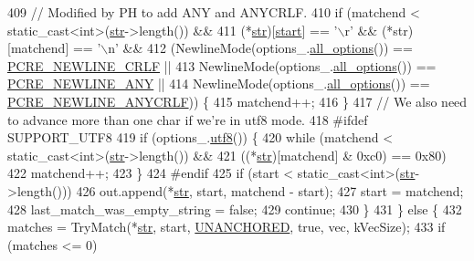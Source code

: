 \begin{DoxyCode}
409         \textcolor{comment}{// Modified by PH to add ANY and ANYCRLF.}
410         \textcolor{keywordflow}{if} (matchend < static\_cast<int>(\hyperlink{group__MOD__DAV_gaab9226fe8f632e1f998e24276d478f30}{str}->length()) &&
411             (*\hyperlink{group__MOD__DAV_gaab9226fe8f632e1f998e24276d478f30}{str})[\hyperlink{group__APACHE__CORE__DAEMON_ga6d3a995932cd00f6b3473898aa90d596}{start}] == \textcolor{charliteral}{'\(\backslash\)r'} && (*str)[matchend] == \textcolor{charliteral}{'\(\backslash\)n'} &&
412             (NewlineMode(options\_.\hyperlink{classpcrecpp_1_1RE__Options_ad0044e20b77cd735b6fb70b6dd8dc245}{all\_options}()) == \hyperlink{pcre_8h_a6d5da3bae2692b4bc458f5638dcafd57}{PCRE\_NEWLINE\_CRLF} ||
413              NewlineMode(options\_.\hyperlink{classpcrecpp_1_1RE__Options_ad0044e20b77cd735b6fb70b6dd8dc245}{all\_options}()) == \hyperlink{pcre_8h_a1c379cd4b51ea037dce7e8c79f9ee57d}{PCRE\_NEWLINE\_ANY} ||
414              NewlineMode(options\_.\hyperlink{classpcrecpp_1_1RE__Options_ad0044e20b77cd735b6fb70b6dd8dc245}{all\_options}()) == 
      \hyperlink{pcre_8h_af25f19586bec4187ca77e617ddc9b98b}{PCRE\_NEWLINE\_ANYCRLF})) \{
415           matchend++;
416         \}
417         \textcolor{comment}{// We also need to advance more than one char if we're in utf8 mode.}
418 \textcolor{preprocessor}{#ifdef SUPPORT\_UTF8}
419         \textcolor{keywordflow}{if} (options\_.\hyperlink{classpcrecpp_1_1RE__Options_a5510afddee3c4e0ddc1d12dfdd210512}{utf8}()) \{
420           \textcolor{keywordflow}{while} (matchend < static\_cast<int>(\hyperlink{group__MOD__DAV_gaab9226fe8f632e1f998e24276d478f30}{str}->length()) &&
421                  ((*\hyperlink{group__MOD__DAV_gaab9226fe8f632e1f998e24276d478f30}{str})[matchend] & 0xc0) == 0x80)
422             matchend++;
423         \}
424 \textcolor{preprocessor}{#endif}
425         \textcolor{keywordflow}{if} (start < static\_cast<int>(\hyperlink{group__MOD__DAV_gaab9226fe8f632e1f998e24276d478f30}{str}->length()))
426           out.append(*\hyperlink{group__MOD__DAV_gaab9226fe8f632e1f998e24276d478f30}{str}, start, matchend - start);
427         start = matchend;
428         last\_match\_was\_empty\_string = \textcolor{keyword}{false};
429         \textcolor{keywordflow}{continue};
430       \}
431     \} \textcolor{keywordflow}{else} \{
432       matches = TryMatch(*\hyperlink{group__MOD__DAV_gaab9226fe8f632e1f998e24276d478f30}{str}, start, \hyperlink{classpcrecpp_1_1RE_aafe8a162d00ec7a7d6d2ba67652735efa8511ace935198310276d68934194a16a}{UNANCHORED}, \textcolor{keyword}{true}, vec, kVecSize);
433       \textcolor{keywordflow}{if} (matches <= 0)

\end{DoxyCode}
